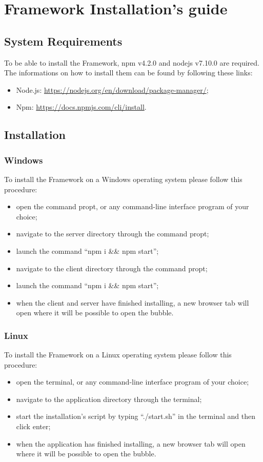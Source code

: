 \section{Framework Installation's guide}

\subsection{System Requirements}
To be able to install the Framework, npm v4.2.0 and nodejs v7.10.0 are required. The informations on how to install them can be found by following these links:
\begin{itemize}
	\item Node.js: \url{https://nodejs.org/en/download/package-manager/};
	\item Npm: \url{https://docs.npmjs.com/cli/install}.
\end{itemize}

\subsection{Installation}

\subsubsection{Windows}

To install the Framework on a Windows operating system please follow this procedure:
\begin{itemize}
	\item open the command propt, or any command-line interface program of your choice;
	\item navigate to the server directory through the command propt;
	\item launch the command ``npm i \&\& npm start'';
	\item navigate to the client directory through the command propt;
	\item launch the command ``npm i \&\& npm start'';
	\item when the client and server have finished installing, a new browser tab will open where it will be possible to open the bubble.
\end{itemize}

\subsubsection{Linux}
To install the Framework on a Linux operating system please follow this procedure:
\begin{itemize}
	\item open the terminal, or any command-line interface program of your choice;
	\item navigate to the application directory through the terminal; 
	\item start the installation's script by typing ``./start.sh'' in the terminal and then click enter;
	\item when the application has finished installing, a new browser tab will open where it will be possible to open the bubble.
\end{itemize}

